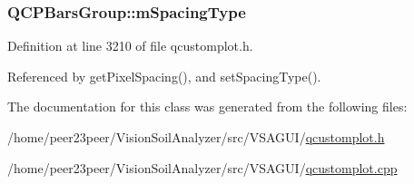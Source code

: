 \subsubsection[{m\+Spacing\+Type}]{ Q\+C\+P\+Bars\+Group\+::m\+Spacing\+Type\hspace{0.3cm}{\ttfamily [protected]}}\label{class_q_c_p_bars_group_a6794ee1a9c81864d627bff6a4b2d64ec}


Definition at line 3210 of file qcustomplot.\+h.



Referenced by get\+Pixel\+Spacing(), and set\+Spacing\+Type().



The documentation for this class was generated from the following files\+:\begin{DoxyCompactItemize}
\item 
/home/peer23peer/\+Vision\+Soil\+Analyzer/src/\+V\+S\+A\+G\+U\+I/\hyperlink{qcustomplot_8h}{qcustomplot.\+h}\item 
/home/peer23peer/\+Vision\+Soil\+Analyzer/src/\+V\+S\+A\+G\+U\+I/\hyperlink{qcustomplot_8cpp}{qcustomplot.\+cpp}\end{DoxyCompactItemize}
